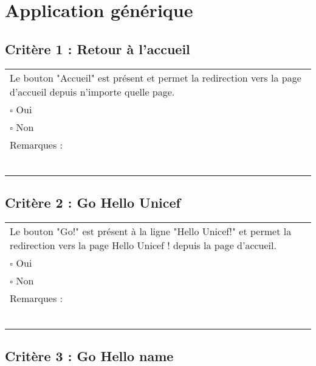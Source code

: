 
\section{Application générique}
	
	\subsection*{Critère 1 : Retour à l'accueil}
	
	\begin{center}
    	 		\begin{tabular}[h]{|p{}|}
			\hline
				Le bouton "Accueil" est présent et permet la redirection vers la page d'accueil depuis n'importe quelle page. \\
				$\square$ Oui  \\ $\square$ Non \\\hline Remarques : \\ ~\\
			 \\\hline
     		\end{tabular}
  		\end{center}	
  		
  		
	\subsection*{Critère 2 : Go Hello Unicef}
	
	\begin{center}
    	 		\begin{tabular}[h]{|p{}|}
			\hline
				Le bouton "Go!" est présent à la ligne "Hello Unicef!" et permet la redirection vers la page Hello Unicef ! depuis la page d'accueil. \\
				$\square$ Oui  \\ $\square$ Non \\\hline Remarques : \\ ~\\
			 \\\hline
     		\end{tabular}
  		\end{center}	
  		
  	\subsection*{Critère 3 : Go Hello name}
	

